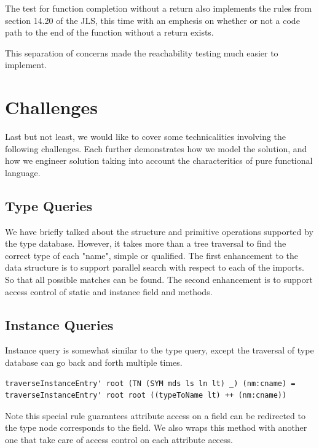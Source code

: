 \documentclass[12pt,letterpaper]{article}
\begin{document}
The test for function completion without a return also implements the rules from section 14.20 of the JLS, this time with an emphesis on whether or not a code path to the end of the function without a return exists.

This separation of concerns made the reachability testing much easier to implement.


\section{Challenges}
Last but not least, we would like to cover some technicalities involving the following challenges. Each further demonstrates how we model the solution, and how we engineer solution taking into account the characteritics of pure functional language.

\subsection{Type  Queries}
We have briefly talked about the structure and primitive operations supported by the type database. However, it takes more than a tree traversal to find the correct type of each "name", simple or qualified. The first enhancement to the data structure is to support parallel search with respect to each of the imports. So that all possible matches can be found. The second enhancement is to support access control of static and instance field and methods.

\subsection{Instance Queries}
Instance query is somewhat similar to the type query, except the traversal of type database can go back and forth multiple times.
\begin{lstlisting}
traverseInstanceEntry' root (TN (SYM mds ls ln lt) _) (nm:cname) = traverseInstanceEntry' root root ((typeToName lt) ++ (nm:cname))
\end{lstlisting}

Note this special rule guarantees attribute access on a field can be redirected to the type node corresponds to the field. We also wraps this method with another one that take care of access control on each attribute access.
\end{document}
